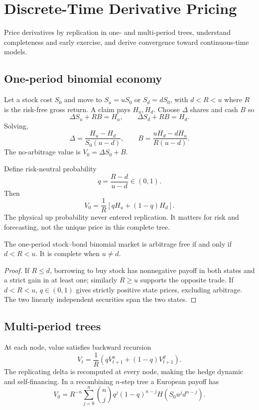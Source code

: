 \chapter{Discrete-Time Derivative Pricing}

\begin{objectives}
Price derivatives by replication in one- and multi-period trees, understand
completeness and early exercise, and derive convergence toward continuous-time
models.
\end{objectives}

\section{One-period binomial economy}

Let a stock cost $S_0$ and move to $S_u=uS_0$ or $S_d=dS_0$, with
$d<R<u$ where $R$ is the risk-free gross return. A claim pays $H_u,H_d$. Choose
$\Delta$ shares and cash $B$ so
\[
\Delta S_u+RB=H_u,\qquad
\Delta S_d+RB=H_d.
\]
Solving,
\[
\Delta=\frac{H_u-H_d}{S_0(u-d)},\qquad
B=\frac{uH_d-dH_u}{R(u-d)}.
\]
The no-arbitrage value is $V_0=\Delta S_0+B$.

Define risk-neutral probability
\[
q=\frac{R-d}{u-d}\in(0,1).
\]
Then
\[
V_0=\frac1R[qH_u+(1-q)H_d].
\]
The physical up probability never entered replication. It matters for risk and
forecasting, not the unique price in this complete tree.

\begin{theorem}
The one-period stock--bond binomial market is arbitrage free if and only if
$d<R<u$. It is complete when $u\neq d$.
\end{theorem}
\begin{proof}
If $R\leq d$, borrowing to buy stock has nonnegative payoff in both states and a
strict gain in at least one; similarly $R\geq u$ supports the opposite trade. If
$d<R<u$, $q\in(0,1)$ gives strictly positive state prices, excluding arbitrage.
The two linearly independent securities span the two states.
\end{proof}

\section{Multi-period trees}

At each node, value satisfies backward recursion
\[
V_{t}=\frac1R\left(qV_{t+1}^{u}+(1-q)V_{t+1}^{d}\right).
\]
The replicating delta is recomputed at every node, making the hedge dynamic and
self-financing. In a recombining $n$-step tree a European payoff has
\[
V_0=R^{-n}\sum_{j=0}^n
\binom{n}{j}q^j(1-q)^{n-j}
H(S_0u^jd^{n-j}).
\]


